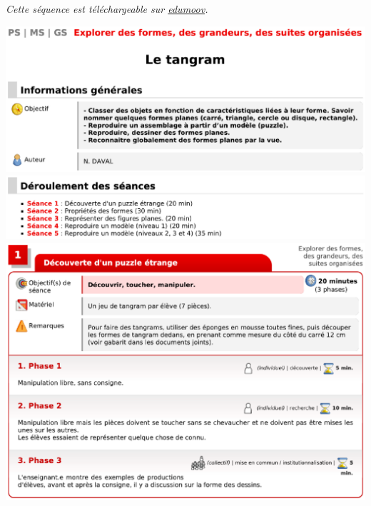 \begin{exercice*}
{\it Cette séquence est téléchargeable sur \href{https://www.edumoov.com/fiche-de-preparation-sequence/34779/explorer-des-formes-des-grandeurs-des-suites-organisees/ms-gs/le-tangram}{edumoov}.}
\begin{center}
   \includegraphics[width=15cm]{Geometrie_did/Images/Geo5_activite_edumoov1} \\
   \includegraphics[width=15cm]{Geometrie_did/Images/Geo5_activite_edumoov2} \\ [10mm]
   \includegraphics[width=15cm]{Geometrie_did/Images/Geo5_activite_edumoov3} \\

\end{center}
\end{exercice*}
